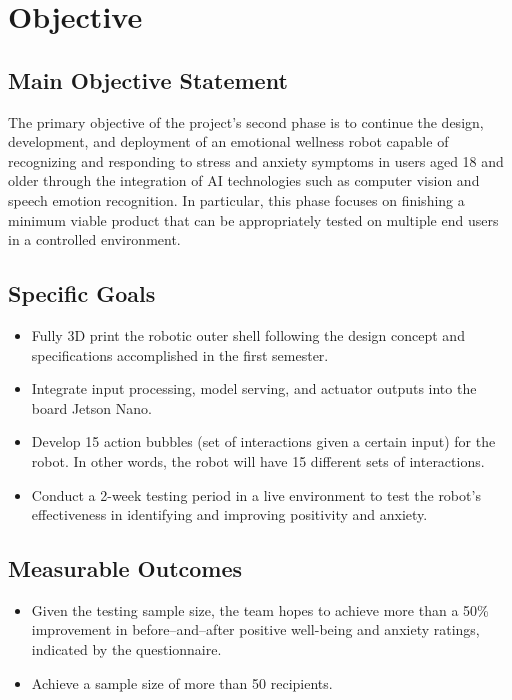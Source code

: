 \section{Objective}

\subsection{Main Objective Statement}
The primary objective of the project’s second phase is to continue the design, development, and deployment of an emotional wellness robot capable of recognizing and responding to stress and anxiety symptoms in users aged 18 and older through the integration of AI technologies such as computer vision and speech emotion recognition. In particular, this phase focuses on finishing a minimum viable product that can be appropriately tested on multiple end users in a controlled environment.

\subsection{Specific Goals}
\begin{itemize}
    \item Fully 3D print the robotic outer shell following the design concept and specifications accomplished in the first semester.
    \item Integrate input processing, model serving, and actuator outputs into the board Jetson Nano.
    \item Develop 15 action bubbles (set of interactions given a certain input) for the robot. In other words, the robot will have 15 different sets of interactions.
    \item Conduct a 2-week testing period in a live environment to test the robot’s effectiveness in identifying and improving positivity and anxiety.
\end{itemize}

\subsection{Measurable Outcomes}
\begin{itemize}
    \item Given the testing sample size, the team hopes to achieve more than a 50\% improvement in before–and–after positive well-being and anxiety ratings, indicated by the questionnaire.
    \item Achieve a sample size of more than 50 recipients.
\end{itemize}